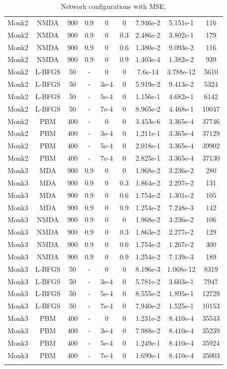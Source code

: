 \begin{center}
\begin{longtable}{|c|c|c|c|c|c|c|c|c|}
			Monk2 & NMDA & 900 & 0.9 & 0  & 0 & 7.946e-2 & 5.151e-1 & 116\\
			Monk2 & NMDA & 900 & 0.9 & 0  & 0.3 & 2.486e-2 & 3.802e-1 & 179\\
			Monk2 & NMDA & 900 & 0.9 & 0  & 0.6 & 1.380e-2 & 9.093e-2 & 116\\
			Monk2 & NMDA & 900 & 0.9 & 0  & 0.9 & 1.403e-4 & 1.382e-2 & 939\\
			Monk2 & L-BFGS & 50 & - & 0  & 0 & 7.6e-14 & 3.788e-12 & 5610\\
			Monk2 & L-BFGS & 50 & - & 3e-4  & 0  & 5.919e-2 & 9.413e-2 & 5324\\
			Monk2 & L-BFGS & 50 & - & 5e-4  & 0  & 1.156e-1& 4.682e-1 & 6142\\
			Monk2 & L-BFGS & 50 & - & 7e-4  & 0  & 8.965e-2 &  4.468e-1 & 10047\\
			Monk2 & PBM & 400 & - & 0  & 0 & 3.453e-6 & 3.365e-4 & 37746\\
			Monk2 & PBM & 400 & - & 3e-4  & 0 & 1.211e-1 & 3.365e-4 & 37129\\
			Monk2 & PBM & 400 & - & 5e-4  & 0 & 2.018e-1 & 3.365e-4 & 39902\\
			Monk2 & PBM & 400 & - & 7e-4  & 0 & 2.825e-1 & 3.365e-4 & 37130\\
			Monk3 & MDA & 900 & 0.9 & 0  & 0 & 1.968e-2 & 3.236e-2 & 280\\
			Monk3 & MDA & 900 & 0.9 & 0  & 0.3 & 1.864e-2 & 2.297e-2 & 131\\
			Monk3 & MDA & 900 & 0.9 & 0  & 0.6 & 1.754e-2 & 1.301e-2 & 105\\
			Monk3 & MDA & 900 & 0.9 & 0  & 0.9 & 1.254e-2 & 7.248e-3 & 142\\
			Monk3 & NMDA & 900 & 0.9 & 0  & 0 & 1.968e-2 & 3.236e-2 & 106\\
			Monk3 & NMDA & 900 & 0.9 & 0  & 0.3 & 1.863e-2 & 2.277e-2 & 129\\
			Monk3 & NMDA & 900 & 0.9 & 0  & 0.6 & 1.754e-2 & 1.267e-2 & 300\\
			Monk3 & NMDA & 900 & 0.9 & 0  & 0.9 & 1.254e-2 & 7.139e-3 & 189\\
			Monk3 & L-BFGS & 50 & - & 0  & 0 & 8.196e-3 & 1.068e-12 & 8319\\
			Monk3 & L-BFGS & 50 & - & 3e-4  & 0  & 5.781e-2 & 3.603e-1 & 7947\\
			Monk3 & L-BFGS & 50 & - & 5e-4  & 0  & 8.555e-2 & 1.895e-1 & 12729\\
			Monk3 & L-BFGS & 50 & - & 7e-4  & 0  & 7.940e-2 & 1.525e-1 & 10153\\
			Monk3 & PBM & 400 & - & 0  & 0 & 1.231e-2 & 8.410e-4 & 35543\\
			Monk3 & PBM & 400 & - & 3e-4  & 0 & 7.988e-2 & 8.410e-4 & 35239\\
			Monk3 & PBM & 400 & - & 5e-4  & 0 & 1.249e-1 & 8.410e-4 & 35924\\
			Monk3 & PBM & 400 & - & 7e-4  & 0 & 1.699e-1 & 8.410e-4 & 35003\\
			\hline
			\caption{Network configurations with MSE.}
			\label{tab:nets_res}
		\end{longtable}

\end{center}

